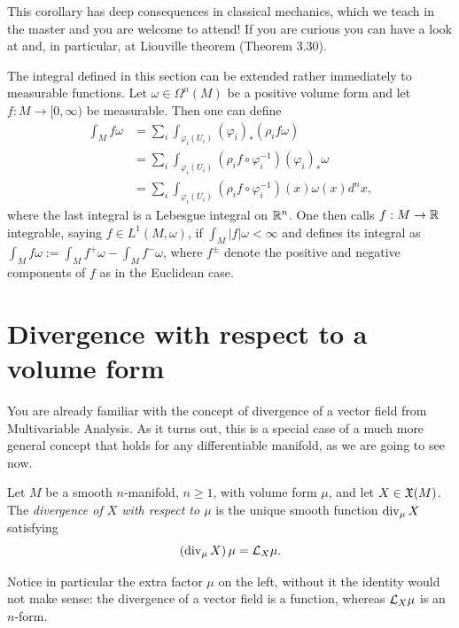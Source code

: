 This corollary has deep consequences in classical mechanics, which we teach in the master and you are welcome to attend! If you are curious you can have a look at \cite[Chapter 3]{lectures:seri:hm} and, in particular, at Liouville theorem (Theorem 3.30).

\begin{remark}
	The integral defined in this section can be extended rather immediately to measurable functions.
	Let $\omega\in\Omega^n(M)$ be a positive volume form and let $f:M\to[0,\infty)$ be measurable.
	Then one can define
	\begin{align}
		\int_M f \omega
		 & = \sum_i \int_{\varphi_i(U_i)} (\varphi_i)_*(\rho_i f\omega)                      \\
		 & = \sum_i \int_{\varphi_i(U_i)} (\rho_i f \circ\varphi_i^{-1}) (\varphi_i)_*\omega \\
		 & = \sum_i \int_{\varphi_i(U_i)} (\rho_i f \circ\varphi_i^{-1})(x) \omega(x) d^n x,
	\end{align}
	where the last integral is a Lebesgue integral on $\mathbb{R}^n$.
	One then calls $f:M\to \mathbb{R}$ integrable, saying $f\in L^1(M,\omega)$, if $\int_M|f|\omega < \infty$ and defines its integral as $\int_M f\omega := \int_M f^+\omega - \int_M f^-\omega$, where $f^\pm$ denote the positive and negative components of $f$ as in the Euclidean case.
\end{remark}

\section{Divergence with respect to a volume form}\label{sec:divergence}

You are already familiar with the concept of divergence of a vector field from Multivariable Analysis. As it turns out, this is a special case of a much more general concept that holds for any differentiable manifold, as we are going to see now.

\begin{definition}
	Let $M$ be a smooth $n$-manifold, $n\geq 1$, with volume form $\mu$, and let $X\in\mathfrak{X}(M)$.
	The \emph{divergence of $X$ with respect to $\mu$} is the unique smooth function $\operatorname{div}_\mu X$ satisfying
	\begin{equation}\label{eq:divergence-volume}
		(\operatorname{div}_\mu X)\,\mu = \mathcal{L}_X\mu.
	\end{equation}
\end{definition}

Notice in particular the extra factor $\mu$ on the left, without it the identity would not make sense: the divergence of a vector field is a function, whereas $\mathcal{L}_X\mu$ is an $n$-form.

